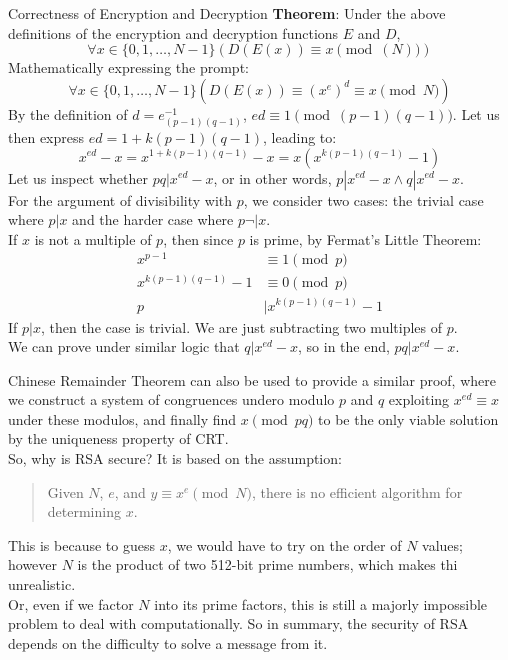 \begin{ln-theorem}{Correctness of Encryption and Decryption}{}
    \textbf{Theorem}: Under the above definitions of the encryption and decryption functions $E$ and $D$,
    \[\forall x \in \{0, 1, \dots, N - 1\} (D(E(x)) \equiv x\pmod(N))\]
    \tcblower
    Mathematically expressing the prompt:
    \[\forall x \in \{0, 1, \dots, N - 1\} (D(E(x)) \equiv {(x^e)}^d \equiv x\pmod{N})\]
    By the definition of $d = {e}_{(p - 1)(q - 1)}^{-1}$, $ed \equiv 1\pmod{(p - 1)(q - 1)}$. Let us then express $ed = 1 + k(p - 1)(q - 1)$, leading to:
    \[x^{ed} - x = x^{1 + k(p - 1)(q - 1)} - x = x(x^{k(p - 1)(q - 1)} - 1)\]
    Let us inspect whether $pq | x^{ed} - x$, or in other words, $p | x^{ed} - x \land q | x^{ed} - x$. \\
    For the argument of divisibility with $p$, we consider two cases: the trivial case where $p | x$ and the harder case where $p \neg| x$. \\
    If $x$ is not a multiple of $p$, then since $p$ is prime, by Fermat's Little Theorem:
    \begin{align*}
        x^{p - 1} &\equiv 1\pmod{p} \\
        x^{k(p - 1)(q - 1)} - 1 &\equiv 0\pmod{p} \\
        p &| x^{k(p - 1)(q - 1)} - 1
    \end{align*}
    If $p | x$, then the case is trivial. We are just subtracting two multiples of $p$. \\
    We can prove under similar logic that $q | x^{ed} - x$, so in the end, $pq | x^{ed} - x$. \\
\end{ln-theorem}
Chinese Remainder Theorem can also be used to provide a similar proof, where we construct a system of congruences undero modulo $p$ and $q$ exploiting $x^{ed} \equiv x$ under these modulos, and finally find $x\pmod{pq}$ to be the only viable solution by the uniqueness property of CRT. \\
So, why is RSA secure? It is based on the assumption:
\begin{quote}
    Given $N$, $e$, and $y \equiv x^e \pmod{N}$, there is no efficient algorithm for determining $x$.
\end{quote}
This is because to guess $x$, we would have to try on the order of $N$ values; however $N$ is the product of two 512-bit prime numbers, which makes thi unrealistic. \\
Or, even if we factor $N$ into its prime factors, this is still a majorly impossible problem to deal with computationally.
So in summary, the security of RSA depends on the difficulty to solve a message from it. \\

